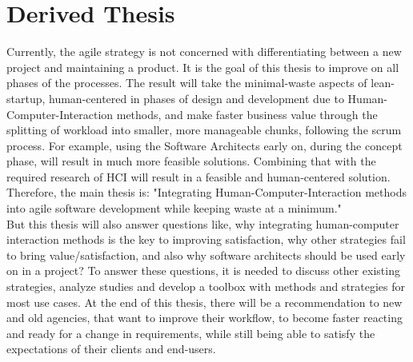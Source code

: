 \section*{Derived Thesis}

Currently, the agile strategy is not concerned with differentiating between a new project and maintaining a product. It is the goal of this thesis to improve on all phases of the processes. The result will take the minimal-waste aspects of lean-startup, human-centered in phases of design and development due to Human-Computer-Interaction methods, and make faster business value through the splitting of workload into smaller, more manageable chunks, following the scrum process. For example, using the Software Architects early on, during the concept phase, will result in much more feasible solutions. Combining that with the required research of HCI will result in a feasible and human-centered solution. \\
Therefore, the main thesis is: "Integrating Human-Computer-Interaction methods into agile software development while keeping waste at a minimum."\\
\newline
But this thesis will also answer questions like, why integrating human-computer interaction methods is the key to improving satisfaction, why other strategies fail to bring value/satisfaction, and also why software architects should be used early on in a project? To answer these questions, it is needed to discuss other existing strategies, analyze studies and develop a toolbox with methods and strategies for most use cases. At the end of this thesis, there will be a recommendation to new and old agencies, that want to improve their workflow, to become faster reacting and ready for a change in requirements, while still being able to satisfy the expectations of their clients and end-users.